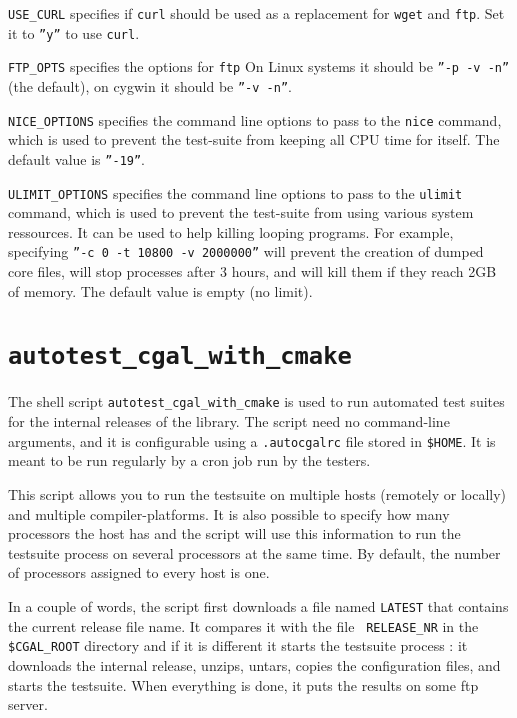 {\tt USE\_CURL} specifies if {\tt curl} should be used as a replacement for
{\tt wget} and {\tt ftp}.  Set it to {\tt ''y''} to use {\tt curl}.

{\tt FTP\_OPTS} specifies the options for {\tt ftp}   On Linux systems 
it should be {\tt ''-p -v -n''} (the default), on cygwin it should be {\tt ''-v -n''}.

{\tt NICE\_OPTIONS} specifies the command line options to pass to the
{\tt nice} command, which is used to prevent the test-suite from keeping
all CPU time for itself.  The default value is {\tt ''-19''}.

{\tt ULIMIT\_OPTIONS} specifies the command line options to pass to the
{\tt ulimit} command, which is used to prevent the test-suite from using
various system ressources.  It can be used to help killing looping programs.
For example, specifying {\tt ''-c 0 -t 10800 -v 2000000''} will prevent
the creation of dumped core files, will stop processes after 3 hours,
and will kill them if they reach 2GB of memory.
The default value is empty (no limit).


\section{{\tt autotest\_cgal\_with\_cmake}}
\label{sec:autotest_cgal_with_cmake}

The shell script {\tt autotest\_cgal\_with\_cmake} is used to run automated test suites for
the internal releases of the library. The script need no command-line
arguments, and it is configurable using a {\tt .autocgalrc} file stored
in {\tt \$HOME}.
It is meant to be run regularly by a cron job run by the testers.

This script allows you to run the testsuite on multiple hosts (remotely or
locally) and multiple compiler-platforms. It is also possible to specify how
many processors the host has and the script will use this information to run
the testsuite process on several processors at the same time. By default, the
number of processors assigned to every host is one.

In a couple of words, the script first downloads a file named {\tt LATEST}
that contains the current release file name. It compares it with the file {\tt
RELEASE\_NR} in the {\tt \$CGAL\_ROOT} directory and if it is different it
starts the testsuite process : it downloads the internal release, unzips,
untars, copies the configuration files, and starts the testsuite. When
everything is done, it puts the results on some ftp server.

